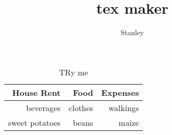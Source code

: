 \documentclass[10pt,a4paper]{article}
\author{Stanley}
\title{tex maker}
\begin{document}
\begin{table}[h!]
\begin{tabular}{|r|r|r|}
\hline
House Rent & Food & Expenses\\
\hline
beverages & clothes & walkings\\
\cline{2-2}
sweet potatoes & beans & maize\\
\hline
\end{tabular}
\caption{TRy me}
\end{table}
\end{document}
